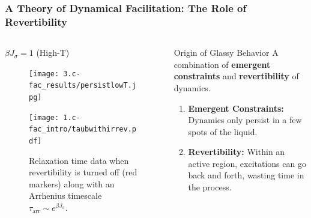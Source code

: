 \documentclass[9pt,professionalfont,t,aspectratio=169]{beamer}
\begin{document}


\begin{frame}
\frametitle{A Theory of Dynamical Facilitation: The Role of Revertibility}

\begin{columns}[T]
\begin{column}[T]{0.6\textwidth}
\centering $\beta J_\sigma = 1$ (High-T)
\begin{figure}[t]

\begin{overprint}
\centering\texttt{[image: 3.c-fac\_results/persistlowT.jpg]}

\centering\texttt{[image: 1.c-fac\_intro/taubwithirrev.pdf]}\caption{Relaxation time data when revertibility is turned off (red markers) along with an Arrhenius timescale $\tau_\mathrm{arr} \sim e^{\beta J_\sigma}$.}

\end{overprint}

\end{figure}
\end{column}

\begin{column}[t]{0.4\textwidth}

\begin{block}{\centering Origin of Glassy Behavior}
\centering A combination of \textbf{emergent constraints} and \textbf{revertibility} of dynamics. 
\end{block}

\begin{enumerate}
   \item<2-> \textbf{Emergent Constraints:} Dynamics only persist in a few spots of the liquid. 
   \item<3-> \textbf{Revertibility:} Within an active region, excitations can go back and forth, wasting time in the process. 
\end{enumerate}

\end{column}

\end{columns}

\end{frame}
\end{document}
